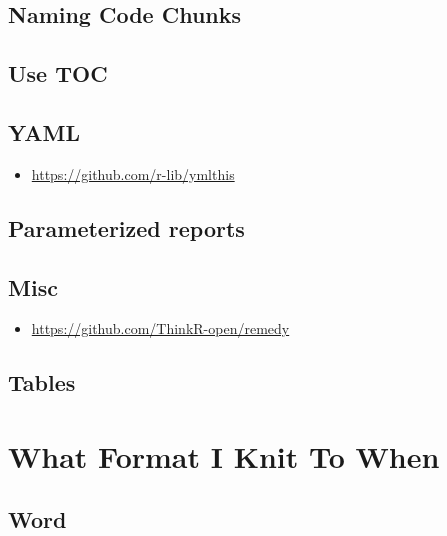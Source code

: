 \documentclass[]{book}
\providecommand{\tightlist}{%
  \setlength{\itemsep}{0pt}\setlength{\parskip}{0pt}}
\begin{document}
\hypertarget{naming-code-chunks}{%
\subsection{Naming Code Chunks}\label{naming-code-chunks}}

\hypertarget{use-toc}{%
\subsection{Use TOC}\label{use-toc}}

\hypertarget{yaml}{%
\subsection{YAML}\label{yaml}}

\begin{itemize}
\tightlist
\item
  \url{https://github.com/r-lib/ymlthis}
\end{itemize}

\hypertarget{parameterized-reports}{%
\subsection{Parameterized reports}\label{parameterized-reports}}

\hypertarget{misc}{%
\subsection{Misc}\label{misc}}

\begin{itemize}
\tightlist
\item
  \url{https://github.com/ThinkR-open/remedy}
\end{itemize}

\hypertarget{tables}{%
\subsection{Tables}\label{tables}}

\hypertarget{what-format-i-knit-to-when}{%
\section{What Format I Knit To When}\label{what-format-i-knit-to-when}}

\hypertarget{word}{%
\subsection{Word}\label{word}}
\end{document}

